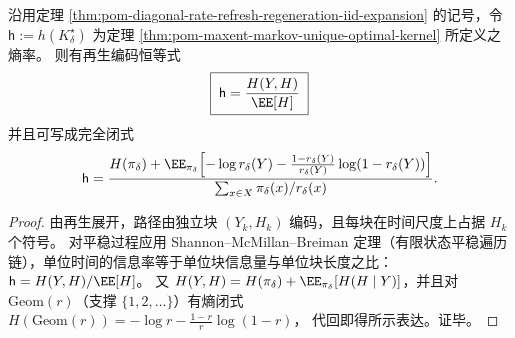 \begin{proposition}[熵率的再生编码闭式]\label{prop:pom-diagonal-rate-refresh-entropy-rate-renewal-coding}
沿用定理 \ref{thm:pom-diagonal-rate-refresh-regeneration-iid-expansion} 的记号，令
\(
\mathsf h:=h(K^\star_\delta)
\)
为定理 \ref{thm:pom-maxent-markov-unique-optimal-kernel} 所定义之熵率。
则有再生编码恒等式
\[
\boxed{\;
\mathsf h=\frac{H(Y,H)}{\EE[H]}\;}
\]
并且可写成完全闭式
\[
\mathsf h
=\frac{H(\pi_\delta)+\EE_{\pi_\delta}\!\left[-\log r_\delta(Y)-\frac{1-r_\delta(Y)}{r_\delta(Y)}\log(1-r_\delta(Y))\right]}{\sum_{x\in X}\pi_\delta(x)/r_\delta(x)}.
\]
\end{proposition}
\begin{proof}
由再生展开，路径由独立块 \((Y_k,H_k)\) 编码，且每块在时间尺度上占据 \(H_k\) 个符号。
对平稳过程应用 Shannon--McMillan--Breiman 定理（有限状态平稳遍历链），单位时间的信息率等于单位块信息量与单位块长度之比：
\(
\mathsf h=H(Y,H)/\EE[H]
\)。
又 \(H(Y,H)=H(\pi_\delta)+\EE_{\pi_\delta}[H(H\mid Y)]\)，并且对 \(\mathrm{Geom}(r)\)（支撑 \(\{1,2,\dots\}\)）有熵闭式
\(
H(\mathrm{Geom}(r))=-\log r-\frac{1-r}{r}\log(1-r)
\)，
代回即得所示表达。证毕。
\end{proof}

\endinput

